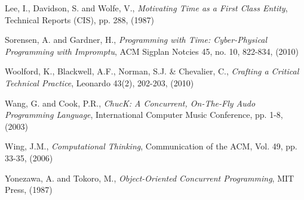 \documentclass[11pt]{scrartcl}
\begin{document}
\begin{thebibliography}{9}
  Lee, I., Davidson, S. and Wolfe, V.,
  \emph{Motivating Time as a First Class Entity},
  Technical Reports (CIS),
  pp. 288,
  (1987)

  Sorensen, A. and Gardner, H.,
  \emph{Programming with Time: Cyber-Physical Programming with Impromptu},
  ACM Sigplan Notcies 45,
  no. 10, 822-834,
  (2010)

  Woolford, K., Blackwell, A.F., Norman, S.J. \& Chevalier, C.,
  \emph{Crafting a Critical Technical Practice},
  Leonardo 43(2),
  202-203,
  (2010)

  Wang, G. and Cook, P.R.,
  \emph{ChucK: A Concurrent, On-The-Fly Audo Programming Language},
  International Computer Music Conference,
  pp. 1-8,
  (2003)

  Wing, J.M.,
  \emph{Computational Thinking},
  Communication of the ACM,
  Vol. 49, pp. 33-35,
  (2006)

  Yonezawa, A. and Tokoro, M.,
  \emph{Object-Oriented Concurrent Programming},
  MIT Press,
  (1987)

\end{thebibliography}
\end{document}
